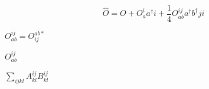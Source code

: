 \documentclass{article}
\begin{document}
\[
\hat O = O + O^i_a a^\dagger i + \frac14 O^{ij}_{ab} a^\dagger b^\dagger j i
\]
\pagebreak

$O^{ij}_{ab}=O_{ij}^{ab*}$
\pagebreak

$O^{ij}_{ab}$
\pagebreak

$\sum_{ijkl} A^{ij}_{kl} B^{ij}_{kl}$
\pagebreak
\end{document}
